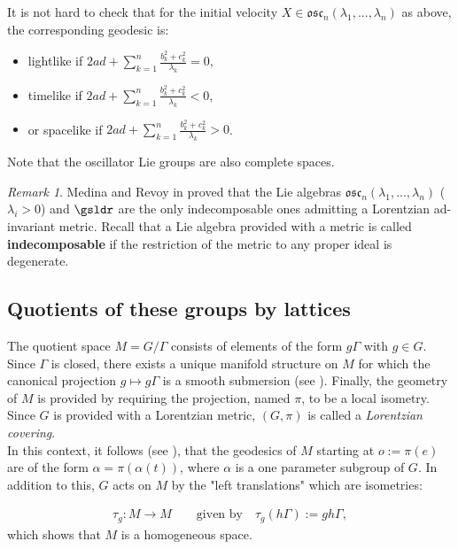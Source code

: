 \documentclass[11pt]{amsart}
\theoremstyle{plain}
\theoremstyle{definition}
\theoremstyle{remark}
\newtheorem{rem}{Remark}
\begin{document}
It is not hard to check that for the initial velocity $X \in \mathfrak{osc}_n(\lambda_1,...,\lambda_n)$ as above, the corresponding geodesic is:
\begin{itemize}
	\item lightlike if $2 a d + \sum_{k=1}^{n} \frac{b_k^2+c_k^2}{\lambda_k} = 0$,
	\item timelike if $2 a d + \sum_{k=1}^{n} \frac{b_k^2+c_k^2}{\lambda_k} < 0$, 
	\item or spacelike if $2 a d + \sum_{k=1}^{n} \frac{b_k^2+c_k^2}{\lambda_k} > 0$.
	\end{itemize}

Note that the oscillator  Lie groups are also complete spaces. 

\smallskip

\begin{rem} Medina and Revoy  in \cite{Me,MeRe} proved that the Lie algebras $\mathfrak{osc}_n(\lambda_1,...,\lambda_n)$ ($\lambda_i > 0$) and $\gsldr$ are the only indecomposable ones admitting a Lorentzian ad-invariant metric. Recall that a Lie algebra provided with a metric is called \textbf{indecomposable} if the restriction of the metric to any proper ideal is degenerate. 
\end{rem}


\subsection{Quotients of these groups by lattices} 



The quotient space $M=G/\Gamma$ consists of elements of the form $g\Gamma$ with $g \in G$. Since $\Gamma$ is closed, there exists a unique manifold structure on $M$ for which the canonical projection $g \mapsto g\Gamma$ is a smooth submersion (see \cite{WAR}). Finally, the geometry of $M$ is provided by requiring the projection, named $\pi$, to be a local isometry. Since $G$ is provided with a Lorentzian metric, $(G,\pi)$ is called  a \textit{Lorentzian covering}.\\



In this context, it follows (see \cite{ON}), that the geodesics of $M$ starting at $o:=\pi(e)$ are of the form $\hat{\alpha}=\pi(\alpha(t))$, where $\alpha$ is a one parameter subgroup of $G$. In addition to this, $G$ acts on $M$ by the "left translations" which are isometries:

\begin{eqnarray*}
\tau_g : M \rightarrow M\qquad \mbox{given by} \quad 
\tau_g(h\Gamma):=gh\Gamma,
\end{eqnarray*}
which shows that $M$ is a homogeneous space. 
\end{document}
